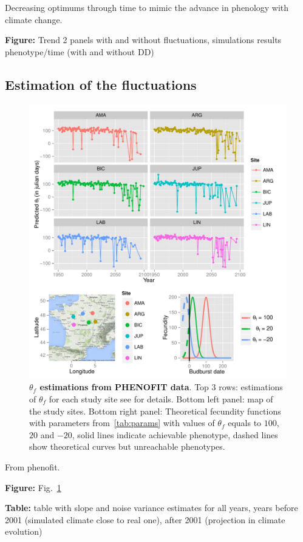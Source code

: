 Decreasing optimums through time to mimic the advance in phenology with climate change.

\textbf{Figure:} Trend 2 panels with and without fluctuations, simulations results phenotype/time (with and without DD)

\subsection*{Estimation of the fluctuations}

\begin{figure}[ht!]
	\centering
	\includegraphics[scale=1]{Figures/optsmaps.pdf}
	\caption{\textbf{$\theta_{f}$ estimations from PHENOFIT data}. Top 3 rows: estimations of $\theta_f$ for each study site see  for details. Bottom left panel: map of the study sites. Bottom right panel: Theoretical fecundity functions with parameters from~\autoref{tab:params} with values of $\theta_f$ equals to $100$, $20$ and $-20$, solid lines indicate achievable phenotype, dashed lines show theoretical curves but unreachable phenotypes.}
	\label{fig:thetaf}
\end{figure}

From phenofit.

\textbf{Figure:} Fig.~\ref{fig:thetaf}

\textbf{Table:} table with slope and noise variance estimates for all years, years before 2001 (simulated climate close to real one), after 2001 (projection in climate evolution)